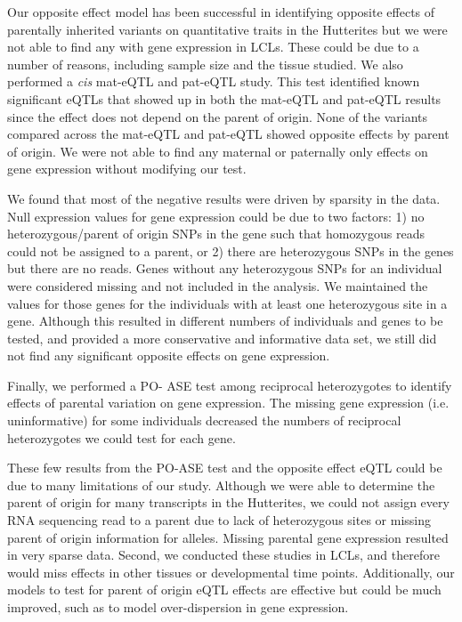 Our opposite effect model has been successful in identifying opposite effects of parentally inherited variants on quantitative traits in the Hutterites but we were not able to find any with gene expression in LCLs. These could be due to a number of reasons, including sample size and the tissue studied. We also performed a \emph{cis} mat-eQTL and pat-eQTL study. This test identified known significant eQTLs that showed up in both the mat-eQTL and pat-eQTL results since the effect does not depend on the parent of origin. None of the variants compared across the mat-eQTL and pat-eQTL showed opposite effects by parent of origin. We were not able to find any maternal or paternally only effects on gene expression without modifying our test.

We found that most of the negative results were driven by sparsity in the data. Null expression values for gene expression could be due to two factors: 1) no heterozygous/parent of origin SNPs in the gene such that homozygous reads could not be assigned to a parent, or 2) there are heterozygous SNPs in the genes but there are no reads. Genes without any heterozygous SNPs for an individual were considered missing and not included in the analysis. We maintained the values for those genes for the individuals with at least one heterozygous site in a gene. Although this resulted in different numbers of individuals and genes to be tested, and provided a more conservative and informative data set, we still did not find any significant opposite effects on gene expression.

Finally, we performed a PO- ASE test among reciprocal heterozygotes to identify effects of parental variation on gene expression. The missing gene expression (i.e. uninformative) for some individuals decreased the numbers of reciprocal heterozygotes we could test for each gene.

These few results from the PO-ASE test and the opposite effect eQTL could be due to many limitations of our study. Although we were able to determine the parent of origin for many transcripts in the Hutterites, we could not assign every RNA sequencing read to a parent due to lack of heterozygous sites or missing parent of origin information for alleles. Missing parental gene expression resulted in very sparse data. Second, we conducted these studies in LCLs, and therefore would miss effects in other tissues or developmental time points. Additionally, our models to test for parent of origin eQTL effects are effective but could be much improved, such as to model over-dispersion in gene expression.

